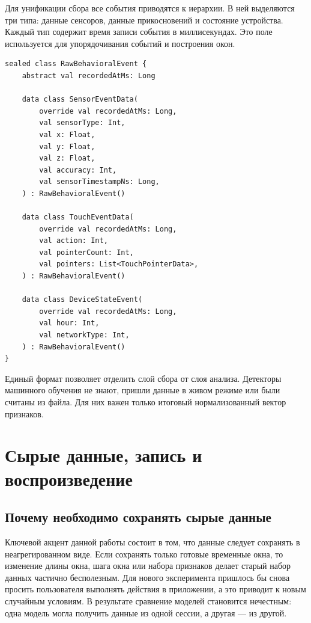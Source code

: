 \documentclass[oneside,senior,etd]{BYUPhys}
\begin{document}
Для унификации сбора все события приводятся к иерархии. В ней выделяются три типа: данные сенсоров, данные прикосновений и состояние устройства. Каждый тип содержит время записи события в миллисекундах. Это поле используется для упорядочивания событий и построения окон.

\begin{lstlisting}[caption={Упрощенная структура сырых событий},label={lst:raw-event}]
sealed class RawBehavioralEvent {
    abstract val recordedAtMs: Long

    data class SensorEventData(
        override val recordedAtMs: Long,
        val sensorType: Int,
        val x: Float,
        val y: Float,
        val z: Float,
        val accuracy: Int,
        val sensorTimestampNs: Long,
    ) : RawBehavioralEvent()

    data class TouchEventData(
        override val recordedAtMs: Long,
        val action: Int,
        val pointerCount: Int,
        val pointers: List<TouchPointerData>,
    ) : RawBehavioralEvent()

    data class DeviceStateEvent(
        override val recordedAtMs: Long,
        val hour: Int,
        val networkType: Int,
    ) : RawBehavioralEvent()
}
\end{lstlisting}

Единый формат позволяет отделить слой сбора от слоя анализа. Детекторы машинного обучения не знают, пришли данные в живом режиме или были считаны из файла. Для них важен только итоговый нормализованный вектор признаков.

\section{Сырые данные, запись и воспроизведение}

\subsection{Почему необходимо сохранять сырые данные}

Ключевой акцент данной работы состоит в том, что данные следует сохранять в неагрегированном виде. Если сохранять только готовые временные окна, то изменение длины окна, шага окна или набора признаков делает старый набор данных частично бесполезным. Для нового эксперимента пришлось бы снова просить пользователя выполнять действия в приложении, а это приводит к новым случайным условиям. В результате сравнение моделей становится нечестным: одна модель могла получить данные из одной сессии, а другая --- из другой.
\end{document}
